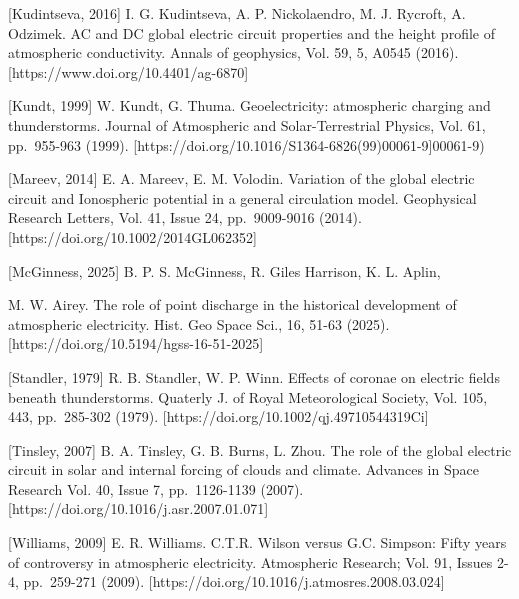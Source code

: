 \documentclass[
]{article}
\begin{document}
{[}Kudintseva, 2016{]} I. G. Kudintseva, A. P. Nickolaendro, M. J.
Rycroft, A. Odzimek. AC and DC global electric circuit properties and
the height profile of atmospheric conductivity. Annals of geophysics,
Vol. 59, 5, A0545 (2016). {[}https://www.doi.org/10.4401/ag-6870{]}

{[}Kundt, 1999{]} W. Kundt, G. Thuma. Geoelectricity: atmospheric
charging and thunderstorms. Journal of Atmospheric and Solar-Terrestrial
Physics, Vol. 61, pp.~955-963 (1999).
{[}https://doi.org/10.1016/S1364-6826(99)00061-9{]}00061-9)

{[}Mareev, 2014{]} E. A. Mareev, E. M. Volodin. Variation of the global
electric circuit and Ionospheric potential in a general circulation
model. Geophysical Research Letters, Vol. 41, Issue 24, pp.~9009-9016
(2014). {[}https://doi.org/10.1002/2014GL062352{]}

{[}McGinness, 2025{]} B. P. S. McGinness, R. Giles Harrison, K. L.
Aplin,

M. W. Airey. The role of point discharge in the historical development
of atmospheric electricity. Hist. Geo Space Sci., 16, 51-63 (2025).
{[}https://doi.org/10.5194/hgss-16-51-2025{]}

{[}Standler, 1979{]} R. B. Standler, W. P. Winn. Effects of coronae on
electric fields beneath thunderstorms. Quaterly J. of Royal
Meteorological Society, Vol. 105, 443, pp.~285-302 (1979).
{[}https://doi.org/10.1002/qj.49710544319Ci{]}

{[}Tinsley, 2007{]} B. A. Tinsley, G. B. Burns, L. Zhou. The role of the
global electric circuit in solar and internal forcing of clouds and
climate. Advances in Space Research Vol. 40, Issue 7, pp.~1126-1139
(2007). {[}https://doi.org/10.1016/j.asr.2007.01.071{]}

{[}Williams, 2009{]} E. R. Williams. C.T.R. Wilson versus G.C. Simpson:
Fifty years of controversy in atmospheric electricity. Atmospheric
Research; Vol. 91, Issues 2-4, pp.~259-271 (2009).
{[}https://doi.org/10.1016/j.atmosres.2008.03.024{]}
\end{document}
